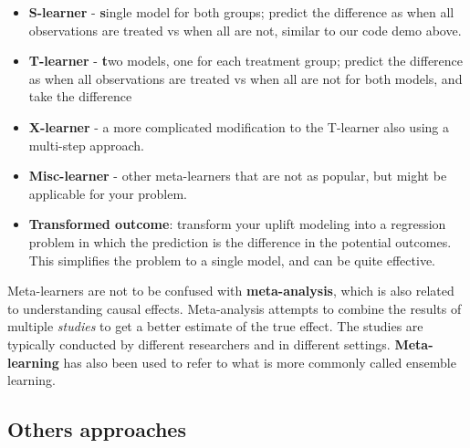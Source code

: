 \documentclass[
  letterpaper,
]{krantz}
\providecommand{\tightlist}{%
  \setlength{\itemsep}{0pt}\setlength{\parskip}{0pt}}\usepackage{longtable,booktabs,array}
\begin{document}
\begin{itemize}
\tightlist
\item
  \textbf{S-learner} - \textbf{s}ingle model for both groups; predict
  the difference as when all observations are treated vs when all are
  not, similar to our code demo above.
\item
  \textbf{T-learner} - \textbf{t}wo models, one for each treatment
  group; predict the difference as when all observations are treated vs
  when all are not for both models, and take the difference
\item
  \textbf{X-learner} - a more complicated modification to the T-learner
  also using a multi-step approach.
\item
  \textbf{Misc-learner} - other meta-learners that are not as popular,
  but might be applicable for your problem.
\item
  \textbf{Transformed outcome}: transform your uplift modeling into a
  regression problem in which the prediction is the difference in the
  potential outcomes. This simplifies the problem to a single model, and
  can be quite effective.
\end{itemize}

\begin{tcolorbox}[enhanced jigsaw, toprule=.15mm, arc=.35mm, rightrule=.15mm, bottomrule=.15mm, leftrule=.75mm, breakable, colframe=quarto-callout-note-color-frame, colback=white, left=2mm, opacityback=0]
\begin{minipage}[t]{5.5mm}
\textcolor{quarto-callout-note-color}{\faInfo}
\end{minipage}%
\begin{minipage}[t]{\textwidth - 5.5mm}

Meta-learners are not to be confused with \textbf{meta-analysis}, which
is also related to understanding causal effects. Meta-analysis attempts
to combine the results of multiple \emph{studies} to get a better
estimate of the true effect. The studies are typically conducted by
different researchers and in different settings. \textbf{Meta-learning}
has also been used to refer to what is more commonly called ensemble
learning.

\end{minipage}%
\end{tcolorbox}

\subsection{Others approaches}\label{others-approaches}
\end{document}

